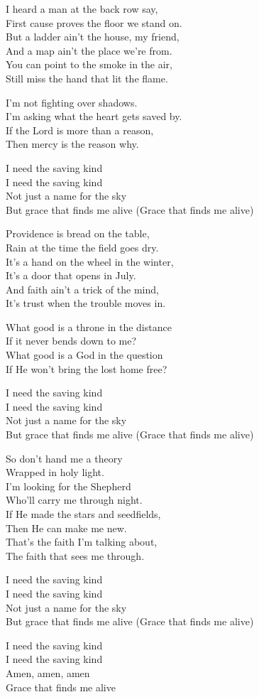 \begin{lyrics}
I heard a man at the back row say,\\
First cause proves the floor we stand on.\\
But a ladder ain’t the house, my friend,\\
And a map ain’t the place we’re from.\\
You can point to the smoke in the air,\\
Still miss the hand that lit the flame.

I’m not fighting over shadows.\\
I’m asking what the heart gets saved by.\\
If the Lord is more than a reason,\\
Then mercy is the reason why.

I need the saving kind\\
I need the saving kind\\
Not just a name for the sky\\
But grace that finds me alive
(Grace that finds me alive)

Providence is bread on the table,\\
Rain at the time the field goes dry.\\
It’s a hand on the wheel in the winter,\\
It’s a door that opens in July.\\
And faith ain’t a trick of the mind,\\
It’s trust when the trouble moves in.

What good is a throne in the distance\\
If it never bends down to me?\\
What good is a God in the question\\
If He won’t bring the lost home free?

I need the saving kind\\
I need the saving kind\\
Not just a name for the sky\\
But grace that finds me alive
(Grace that finds me alive)

So don’t hand me a theory\\
Wrapped in holy light.\\
I’m looking for the Shepherd\\
Who’ll carry me through night.\\
If He made the stars and seedfields,\\
Then He can make me new.\\
That’s the faith I’m talking about,\\
The faith that sees me through.

I need the saving kind\\
I need the saving kind\\
Not just a name for the sky\\
But grace that finds me alive
(Grace that finds me alive)

I need the saving kind\\
I need the saving kind\\
Amen, amen, amen\\
Grace that finds me alive
\end{lyrics}

